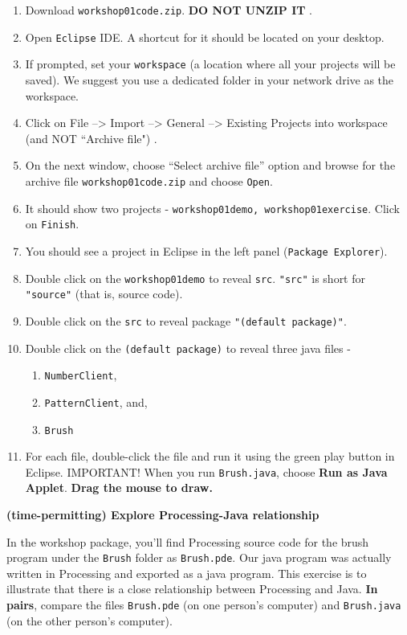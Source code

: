 \begin{questions}
\begin{enumerate}
\item Download \texttt{workshop01code.zip}. \textbf{\color{red} DO NOT UNZIP IT} \color{black}.
\item Open \texttt{Eclipse} IDE. A shortcut for it should be located on your desktop.
\item If prompted, set your \texttt{workspace} (a location where all your projects will be saved). We suggest you use a dedicated folder in your network drive as the workspace.
\item Click on \color{blue} File --> Import --> General --> Existing Projects into workspace \color{red} (and NOT ``Archive file") \color{black}.
\item On the next window, choose ``Select archive file'' option and browse for the archive file \texttt{workshop01code.zip} and choose \texttt{Open}.
\item It should show two projects - \texttt{workshop01demo, workshop01exercise}. Click on \texttt{Finish}.
\item You should see a project in Eclipse in the left panel (\texttt{Package Explorer}).
\item Double click on the \texttt{workshop01demo} to reveal \texttt{src}. \texttt{"src"} is short for \texttt{"source"} (that is, source code).
\item Double click on the \texttt{src} to reveal package \texttt{"(default package)"}.
\item Double click on the \texttt{(default package)} to reveal three java files -

\begin{enumerate}
\item \texttt{NumberClient},
\item \texttt{PatternClient}, and,
\item \texttt{Brush}
\end{enumerate}

\item For each file, double-click the file and run it using the green play button in Eclipse. \color{red} IMPORTANT! \color{black} When you run \texttt{Brush.java}, choose \textbf{Run as Java Applet}. \textbf{Drag the mouse to draw.}
\end{enumerate}

\question \textbf{(time-permitting) Explore Processing-Java relationship} \vskip 0.5cm

In the workshop package, you'll find Processing source code for the brush program under the \texttt{Brush} folder as \texttt{Brush.pde}. Our java program was actually written in Processing and exported as a java program. This exercise is to illustrate that there is a close relationship between Processing and Java. \textbf{In pairs}, compare the files \texttt{Brush.pde} (on one person's computer) and \texttt{Brush.java} (on the other person's computer).


\end{questions}
